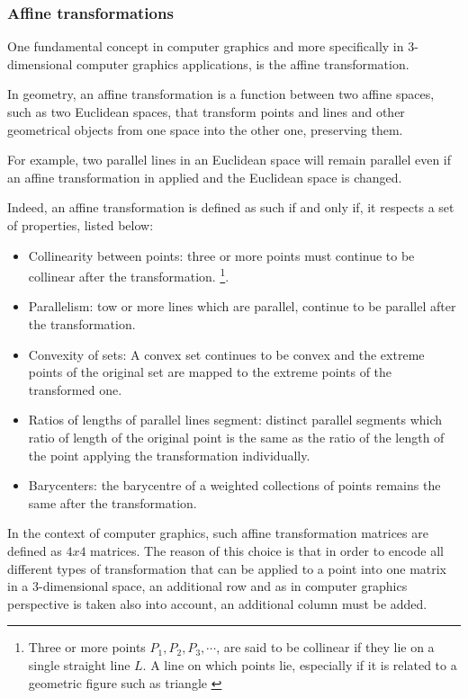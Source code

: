 \documentclass[12pt,a4paper]{extarticle}
\newcommand{\linespace}{\vspace{0pt}}
\begin{document}
\subsubsection{Affine transformations}
One fundamental concept in computer graphics and more specifically in 3-dimensional computer graphics applications, is the affine transformation.
\linespace

In geometry, an affine transformation is a function between two affine spaces, such as two Euclidean spaces, that transform points and lines and other geometrical objects from one space into the other one, preserving them. 

For example, two parallel lines in an Euclidean space will remain parallel even if an affine transformation in applied and the Euclidean space is changed.

Indeed, an affine transformation is defined as such if and only if, it respects a set of properties, listed below:
\begin{itemize}
\item Collinearity between points: three or more points must continue to be collinear after the transformation. \footnote{Three or more points $P_{1},P_{2},P_{3},\cdots$, are said to be collinear if they lie on a single straight line $L$. A line on which points lie, especially if it is related to a geometric figure such as triangle  \cite{Weisstein2019Aug}}.
\item Parallelism: tow or more lines which are parallel, continue to be parallel after the transformation.
\item Convexity of sets: A convex set continues to be convex and the extreme points of the original set are mapped to the extreme points of the transformed one.
\item Ratios of lengths of parallel lines segment: distinct parallel segments which ratio of length of the original point is the same as the ratio of the length of the point applying the transformation individually.
\item Barycenters: the barycentre of a weighted collections of points remains the same after the transformation.
\end{itemize}

In the context of computer graphics, such affine transformation matrices are defined as $4x4$ matrices. The reason of this choice is that in order to encode all different types of transformation that can be applied to a point into one matrix in a 3-dimensional space, an additional row and as in computer graphics perspective is taken also into account, an additional column must be added.
\linespace
\end{document}
